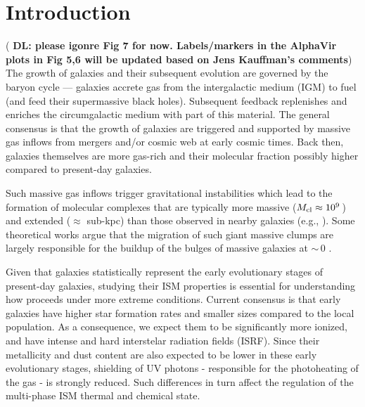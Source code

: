 \IfFileExists{emulateapjlegacy.cls}{\documentclass[iop]{emulateapjlegacy}}{\documentclass[iop]{emulateapj}}
\newcommand{\DL}[1]{({\bf \color{dlcolor} DL: #1})}
\begin{document}

\section{Introduction}
\DL{please igonre Fig 7 for now. Labels/markers in the AlphaVir plots in Fig 5,6 will be updated based on Jens Kauffman's comments} 
The growth of galaxies and their subsequent evolution are governed by the baryon cycle --- galaxies accrete gas from the intergalactic medium (IGM) to fuel \SF (and feed their supermassive black holes). Subsequent feedback replenishes and enriches the circumgalactic medium with part of this material. The general consensus is that the growth of \highz galaxies are triggered and supported by massive gas inflows from mergers and/or cosmic web at early cosmic times. Back then, galaxies themselves are more gas-rich and their molecular fraction possibly higher compared to present-day galaxies.

Such massive gas inflows trigger gravitational instabilities which lead to the formation of molecular complexes that are typically more massive ($M_{\rm cl}\approx 10^9$\,\Msun) and extended ($\approx$ sub-kpc) than those observed in nearby galaxies (e.g., \citealt{Gabor13a, Hopkins14a, Inoue16a}).
%
Some theoretical works argue that the migration of such giant massive clumps are largely responsible for the buildup of the bulges of massive galaxies at \z$\sim$\,0 \citep[e.g.,][]{Ceverino10a}.

Given that \highz galaxies statistically represent  the early evolutionary stages of present-day galaxies, studying their ISM properties is essential for understanding how \SF proceeds under more extreme conditions. Current consensus is that early galaxies have higher star formation rates \citep[SFR; ][]{Behroozi13b, Sparre15a, Maiolino15a, Dunlop17a} and smaller sizes \citep[e.g.,][]{Bouwens11a, Ono13a} compared to the local population.
%
As a consequence, we expect them to be significantly more ionized, and have intense and hard interstelar radiation fields (ISRF). Since their metallicity and dust content are also expected to be lower in these early evolutionary stages, shielding of UV photons - responsible for the photoheating of the gas - is strongly reduced. Such differences in turn affect the regulation of the multi-phase ISM thermal and chemical state.
\end{document}
